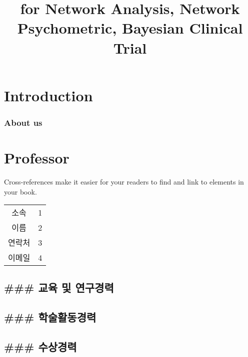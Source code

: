 \documentclass[
]{book}
\title{for Network Analysis, Network Psychometric, Bayesian Clinical Trial}
\author{}
\date{\vspace{-2.5em}}
\begin{document}
\maketitle

{
\setcounter{tocdepth}{1}
\tableofcontents
}
\hypertarget{introduction}{%
\chapter{Introduction}\label{introduction}}

\hypertarget{about-us}{%
\subsection{About us}\label{about-us}}

\hypertarget{professor}{%
\chapter{Professor}\label{professor}}

Cross-references make it easier for your readers to find and link to elements in your book.

\begin{longtable}[]{@{}cc@{}}
\toprule
& \\
\midrule
\endhead
소속 & 1 \\
이름 & 2 \\
연락처 & 3 \\
이메일 & 4 \\
\bottomrule
\end{longtable}

\hypertarget{uxad50uxc721-uxbc0f-uxc5f0uxad6cuxacbduxb825}{%
\section{\#\#\# 교육 및 연구경력}\label{uxad50uxc721-uxbc0f-uxc5f0uxad6cuxacbduxb825}}

\hypertarget{uxd559uxc220uxd65cuxb3d9uxacbduxb825}{%
\section{\#\#\# 학술활동경력}\label{uxd559uxc220uxd65cuxb3d9uxacbduxb825}}

\hypertarget{uxc218uxc0c1uxacbduxb825}{%
\section{\#\#\# 수상경력}\label{uxc218uxc0c1uxacbduxb825}}
\end{document}
